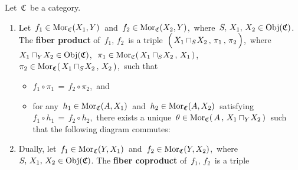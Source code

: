 
\vskip 0.5cm
\begin{definition}
\mbox{}
\vskip 0.15cm
\noindent
Let \,$\mathfrak{C}$\, be a category.
\begin{enumerate}
\item
	Let
	\,$f_{1} \in \textnormal{Mor}_{\mathfrak{C}}(X_{1},Y)$\,
	and
	\,$f_{2} \in \textnormal{Mor}_{\mathfrak{C}}(X_{2},Y)$,\,
	where
	\,$S,\, X_{1},\, X_{2} \in \textnormal{Obj}(\mathfrak{C})$.
	The \textbf{fiber product} of \,$f_{1},\, f_{2}$\, is a triple
	\,$\left(\,X_{1}\overset{{\color{white}.}}{\sqcap_{S}}\!X_{2} \,,\, \pi_{1} \,,\, \pi_{2}\,\right)$,\,
	where
	\,$X_{1}\sqcap_{Y}\!X_{2} \in \textnormal{Obj}(\mathfrak{C})$,\,
	\,$\pi_{1} \in \textnormal{Mor}_{\mathfrak{C}}(\,X_{1}\sqcap_{S}\!X_{2}\,,\,X_{1}\,)$,\,
	\,$\pi_{2} \in \textnormal{Mor}_{\mathfrak{C}}(\,X_{1}\sqcap_{S}\!X_{2}\,,\,X_{2}\,)$,\,
	such that
	\begin{itemize}
	\item
		$f_{1} \circ \pi_{1} \,=\, f_{2} \circ \pi_{2}$,\, and
	\item
		for any
		\,$h_{1} \in \textnormal{Mor}_{\mathfrak{C}}(A,X_{1})$\,
		and
		\,$h_{2} \in \textnormal{Mor}_{\mathfrak{C}}(A,X_{2})$\,
		satisfying
		\,$f_{1} \circ h_{1} \,=\, f_{2} \circ h_{2}$,\,
		there exists a unique
		\,$\theta \in \textnormal{Mor}_{\mathfrak{C}}(\,A\,,\,X_{1}\sqcap_{Y}\!X_{2}\,)$\,
		such that the following diagram commutes:
		\begin{center}
		\end{center}
	\end{itemize}
\item
	Dually, let
	\,$f_{1} \in \textnormal{Mor}_{\mathfrak{C}}(Y,X_{1})$\,
	and
	\,$f_{2} \in \textnormal{Mor}_{\mathfrak{C}}(Y,X_{2})$,\,
	where
	\,$S,\, X_{1},\, X_{2} \in \textnormal{Obj}(\mathfrak{C})$.
	The \textbf{fiber coproduct} of \,$f_{1},\, f_{2}$\, is a triple

\end{enumerate}
\end{definition}
